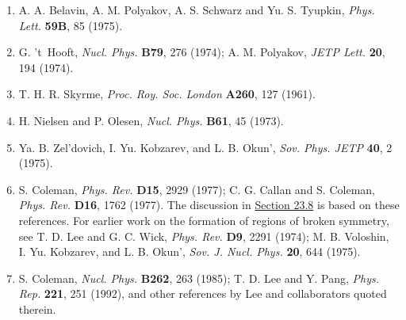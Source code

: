 


\begin{enumerate}
\item {}\label{ch23-ref-1}
A. A. Belavin, A. M. Polyakov, A. S. Schwarz and Yu. S. Tyupkin,
\emph{Phys. Lett.} \textbf{59B}, 85 (1975).

\item {}\label{ch23-ref-2}
G. 't~Hooft, \emph{Nucl. Phys.} \textbf{B79}, 276 (1974);
A. M. Polyakov, \emph{JETP Lett.} \textbf{20}, 194 (1974).

\item {}\label{ch23-ref-3}
T. H. R. Skyrme, \emph{Proc. Roy. Soc. London} \textbf{A260}, 127
(1961).

\item {}\label{ch23-ref-4}
H. Nielsen and P. Olesen, \emph{Nucl. Phys.} \textbf{B61}, 45 (1973).

\item {}\label{ch23-ref-5}
Ya. B. Zel'dovich, I. Yu. Kobzarev, and L. B. Okun',
\emph{Sov. Phys. JETP} \textbf{40}, 2 (1975).

\item {}\label{ch23-ref-6}
S. Coleman, \emph{Phys. Rev.} \textbf{D15}, 2929 (1977);
C. G. Callan and S. Coleman, \emph{Phys. Rev.} \textbf{D16}, 1762
(1977). The discussion in \hyperref[sec:23.8]{Section 23.8} is based on
these references. For earlier work on the formation of regions of broken
symmetry, see T. D. Lee and G. C. Wick, \emph{Phys. Rev.} \textbf{D9},
2291 (1974); M. B. Voloshin, I. Yu. Kobzarev, and L. B. Okun',
\emph{Sov. J. Nucl. Phys.} \textbf{20}, 644 (1975).

\item {}\label{ch23-ref-7}
S. Coleman, \emph{Nucl. Phys.} \textbf{B262}, 263 (1985);
T. D. Lee and Y. Pang, \emph{Phys. Rep.} \textbf{221}, 251 (1992),
and other references by Lee and collaborators quoted therein.


\end{enumerate}

